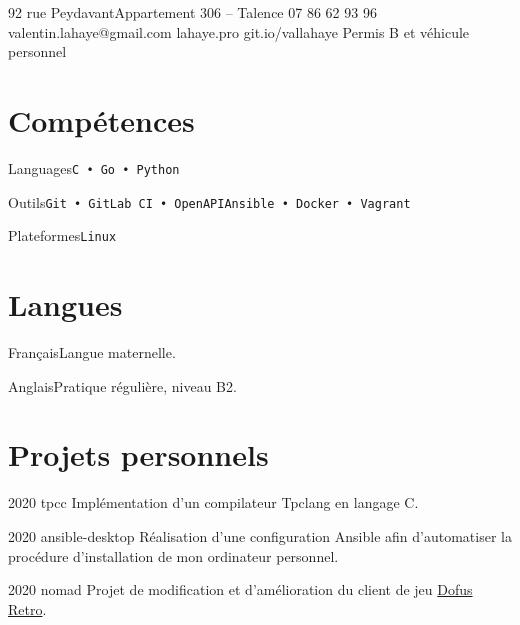 \documentclass{tccv}
\begin{document}
\personal
    {92 rue Peydavant\newline Appartement 306 -- Talence}
    {07 86 62 93 96}
    {valentin.lahaye@gmail.com}
    {lahaye.pro}
    {git.io/vallahaye}
    {Permis B et véhicule personnel}

\section{Compétences}
\begin{factlist}

\item{Languages}{\texttt{C • Go • Python}}

\item{Outils}{\texttt{Git • GitLab CI • OpenAPI}\newline\texttt{Ansible • Docker • Vagrant}}

\item{Plateformes}{\texttt{Linux}}

\end{factlist}

\section{Langues}
\begin{factlist}

\item{Français}{Langue maternelle.}

\item{Anglais}{Pratique régulière, niveau B2.}

\end{factlist}

\section{Projets personnels}
\begin{yearlist}

\item{2020}
    {tpcc \href{https://github.com/vallahaye/tpcc}{\scriptsize\faExternalLink}}
    {Implémentation d'un compilateur Tpclang en langage C.}

\item{2020}
    {ansible-desktop \href{https://github.com/vallahaye/ansible-desktop}{\scriptsize\faExternalLink}}
    {Réalisation d'une configuration Ansible afin d'automatiser la procédure d'installation de mon ordinateur personnel.}

\item{2020}
    {nomad \href{https://gitlab.com/emurub/nomad}{\scriptsize\faExternalLink}}
    {Projet de modification et d'amélioration du client de jeu
    \href{https://www.dofus.com/fr/plus-dofus/dofus-retro}{Dofus Retro}.}

\end{yearlist}
\end{document}
